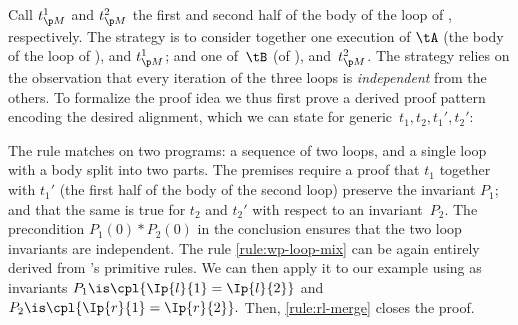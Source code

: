 Call $\tBet{1}$ and $\tBet{2}$ the first and second half of the body of the loop
of , respectively.
The strategy
is to consider together one execution of $\tA$
(the body of the loop of ),
and $\tBet{1}$;
and one of~$\tB$ (of ),
and~$\tBet{2}$.
The strategy relies on the observation that every iteration of the three loops
is \emph{independent} from the others.
To formalize the proof idea we thus first prove a derived proof pattern
encoding the desired alignment, which we can state for generic~$t_1,t_2,t_1',t_2'$:
\begin{proofrule}
     \label{rule:wp-loop-mix}
\end{proofrule}
The rule matches on two programs: a sequence of two loops,
and a single loop with a body split into two parts.
The premises require a proof that $t_1$ together with $t_1'$ (the first half of the body of the second loop) preserve the invariant $P_1$;
and that the same is true for $t_2$ and $t_2'$ with respect to an invariant~$P_2$.
The precondition $P_1(0)*P_2(0)$ in the conclusion ensures that the two
loop invariants are independent.
The rule \ref{rule:wp-loop-mix} can be again entirely derived
from \thelogic's primitive rules.
We can then apply it to our example
using as invariants
$
  P_1 \is \cpl{\Ip{l}{1} = \Ip{l}{2}}
$ and $
  P_2 \is \cpl{\Ip{r}{1} = \Ip{r}{2}}.
$
Then, \ref{rule:rl-merge} closes the proof.

\endgroup

